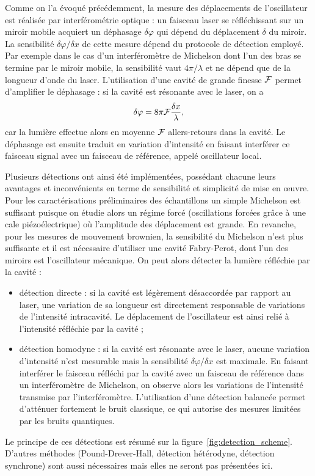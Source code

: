 \documentclass[12pt,a4paper]{article}
\begin{document}
Comme on l'a évoqué précédemment, la mesure des déplacements de l'oscillateur est réalisée par interférométrie optique : un faisceau laser se réfléchissant sur un miroir mobile acquiert un déphasage $\delta\varphi$ qui dépend du déplacement $\delta$ du miroir.
La sensibilité $\delta\varphi / \delta x$ de cette mesure dépend du protocole de détection employé.
Par exemple dans le cas d'un interféromètre de Michelson dont l'un des bras se termine par le miroir mobile, la sensibilité vaut $4\pi/\lambda$ et ne dépend que de la longueur d'onde du laser.
L'utilisation d'une cavité de grande finesse $\cal{F}$ permet d'amplifier le déphasage : si la cavité est résonante avec le laser, on a
\begin{equation}
\delta \varphi = 8\pi{\cal{F}}\frac{\delta x}{\lambda},
\end{equation}
car la lumière effectue alors en moyenne ${\cal{F}}$ allers-retours dans la cavité.
Le déphasage est ensuite traduit en variation d'intensité en faisant interférer ce faisceau signal avec un faisceau de référence, appelé oscillateur local.

Plusieurs détections ont ainsi été implémentées, possédant chacune leurs avantages et inconvénients en terme de sensibilité et simplicité de mise en œuvre.
Pour les caractérisations préliminaires des échantillons un simple Michelson est suffisant puisque on étudie alors un régime forcé (oscillations forcées grâce à une cale piézoélectrique) où l'amplitude des déplacement est grande.
En revanche, pour les mesures de mouvement brownien, la sensibilité du Michelson n'est plus suffisante et il est nécessaire d'utiliser une cavité Fabry-Perot, dont l'un des miroirs est l'oscillateur mécanique.
On peut alors détecter la lumière réfléchie par la cavité :
\begin{itemize}
\item détection directe : si la cavité est légèrement désaccordée par rapport au laser, une variation de sa longueur est directement responsable de variations de l'intensité intracavité.
Le déplacement de l'oscillateur est ainsi relié à l'intensité réfléchie par la cavité ;
\item détection homodyne : si la cavité est résonante avec le laser, aucune variation d'intensité n'est mesurable mais la sensibilité $\delta\varphi/\delta x$ est maximale.
En faisant interférer le faisceau réfléchi par la cavité avec un faisceau de référence dans un interféromètre de Michelson, on observe alors les variations de l'intensité transmise par l'interféromètre.
L'utilisation d'une détection balancée permet d'atténuer fortement le bruit classique, ce qui autorise des mesures limitées par les bruits quantiques. 
\end{itemize}
Le principe de ces détections est résumé sur la figure~\ref{fig:detection_scheme}.
D'autres méthodes (Pound-Drever-Hall, détection hétérodyne, détection synchrone) sont aussi nécessaires mais elles ne seront pas présentées ici.
\end{document}
